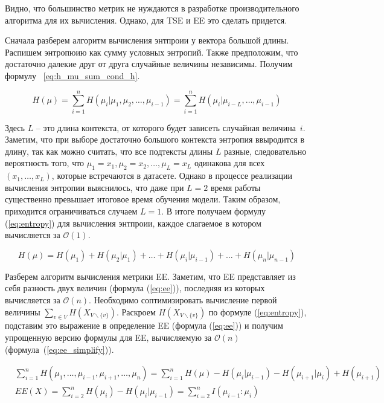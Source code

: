 \documentclass{spbau-diploma}
\begin{document}
Видно, что большинство метрик не нуждаются в разработке производительного алгоритма для их вычисления. Однако, для TSE и EE это сделать придется.

Сначала разберем алгоритм вычисления энтпроии у вектора большой длины. Распишем энтропюию как сумму условных энтропий. Также предположим, что достаточно далекие друг от друга случайные величины независимы. Получим формулу~ \ref{eq:h_mu_sum_cond_h}.

\begin{equation} \label{eq:h_mu_sum_cond_h}
H(\mu) = \sum\limits_{i=1}^{n}H(\mu_i|\mu_1,\mu_2,\ldots,\mu_{i-1}) = \sum\limits_{i=1}^{n}H(\mu_i|\mu_{i-L},\ldots,\mu_{i-1})
\end{equation}

Здесь $L$ -- это длина контекста, от которого будет зависеть случайная величина~$i$. Заметим, что при выборе достаточно большого контекста энтропия ввыродится в длину, так как можно считать, что все подтексты длины $L$ разные, следовательно вероятность того, что $\mu_1=x_1,\mu_2=x_2,\ldots,\mu_L=x_L$ одинакова для всех $(x_1,\ldots,x_L)$, которые встречаются в датасете. Однако в процессе реализации вычисления энтропии выяснилось, что даже при $L = 2$ время работы существенно превышает итоговое время обучения модели. Таким образом, приходится ограничиваться случаем $L=1$. В итоге получаем формулу (\ref{eq:entropy}) для вычисления энтпроии, каждое слагаемое в котором вычисляется за $\mathcal{O}(1)$.

\begin{equation} \label{eq:entropy}
H(\mu) = H(\mu_1) + H(\mu_2|\mu_1) + \ldots + H(\mu_i|\mu_{i-1}) + \ldots + H(\mu_n|\mu_{n-1})
\end{equation}

Разберем алгоритм вычисления метрики EE. Заметим, что EE представляет из себя разность двух величин (формула (\ref{eq:ee})), последняя из которых вычисляется за $\mathcal{O}(n)$. Необходимо соптимизировать вычисление первой величины $\sum\limits_{v\in V}H(X_{V\backslash\{v\}})$. Раскроем $H(X_{V\backslash\{v\}})$ по формуле (\ref{eq:entropy}), подставим это выражение в определение EE (формула (\ref{eq:ee})) и получим упрощенную версию формулы для EE, вычисляемую за $\mathcal{O}(n)$ (формула~(\ref{eq:ee_simplify})).

\begin{equation} \label{eq:ee_simplify}
\begin{split}
& \sum\limits_{i=1}^{n}H(\mu_1,\ldots,\mu_{i-1},\mu_{i+1},\ldots,\mu_n) =
\sum\limits_{i=1}^{n}H(\mu) - H(\mu_i|\mu_{i-1}) - H(\mu_{i+1}|\mu_i) + H(\mu_{i+1}) \\
& EE(X) = \sum\limits_{i=2}^{n}H(\mu_i) - H(\mu_i|\mu_{i-1})= \sum\limits_{i=2}^{n}I(\mu_{i-1}\colon\mu_i)
\end{split}
\end{equation}
\end{document}
